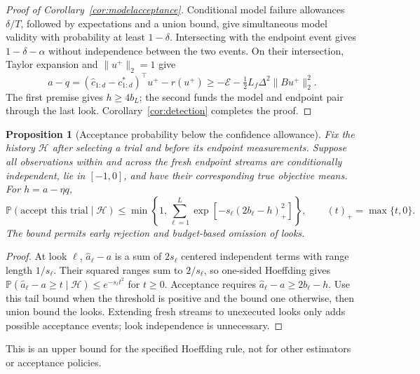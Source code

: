 \documentclass[11pt]{article}
\newcommand{\Prb}{\mathbb P}
\newcommand{\norm}[1]{\lVert #1\rVert}
\newtheorem{proposition}[theorem]{Proposition}
\begin{document}
\FloatBarrier
\begin{proof}[Proof of Corollary~\ref{cor:modelacceptance}]
Conditional model failure allowances $\delta/T$, followed by expectations
and a union bound, give simultaneous model validity with probability at
least $1-\delta$. Intersecting with the endpoint event gives
$1-\delta-\alpha$ without independence between the two events. On their
intersection, Taylor expansion and $\norm{u^+}_2=1$ give
\[
 a-q=(\widehat c_{1:d}-c^*_{1:d})^\top u^+-r(u^+)
 \ge-\mathcal E-\tfrac12L_f\Delta^2\norm{Bu^+}_2^2.
\]
The first premise gives $h\ge4b_L$; the second funds the model and endpoint
pair through the last look. Corollary~\ref{cor:detection} completes the proof.
\end{proof}
\begin{proposition}[Acceptance probability below the confidence allowance]
\label{prop:acceptancepower}
Fix the history $\mathcal H$ after selecting a trial and before its endpoint
measurements. Suppose all observations within and across the fresh endpoint
streams are conditionally independent, lie in $[-1,0]$, and have their
corresponding true objective means. For $h=a-\eta q$,
\begin{equation}
 \Prb(\text{accept this trial}\mid\mathcal H)
 \le\min\left\{1,\sum_{\ell=1}^L
 \exp\!\left[-s_\ell(2b_\ell-h)_+^2\right]\right\},
 \qquad(t)_+=\max\{t,0\}.
 \label{eq:acceptancepower}
\end{equation}
The bound permits early rejection and budget-based omission of looks.
\end{proposition}
\begin{proof}
At look $\ell$, $\widehat a_\ell-a$ is a sum of $2s_\ell$ centered
independent terms with range length $1/s_\ell$. Their squared ranges sum
to $2/s_\ell$, so one-sided Hoeffding gives
$\Prb(\widehat a_\ell-a\ge t\mid\mathcal H)\le e^{-s_\ell t^2}$ for
$t\ge0$. Acceptance requires $\widehat a_\ell-a\ge2b_\ell-h$.
Use this tail bound when the threshold is positive and the bound one
otherwise, then union bound the looks. Extending fresh streams to unexecuted
looks only adds possible acceptance events; look independence is unnecessary.
\end{proof}
This is an upper bound for the specified Hoeffding rule, not for other
estimators or acceptance policies.
\end{document}
